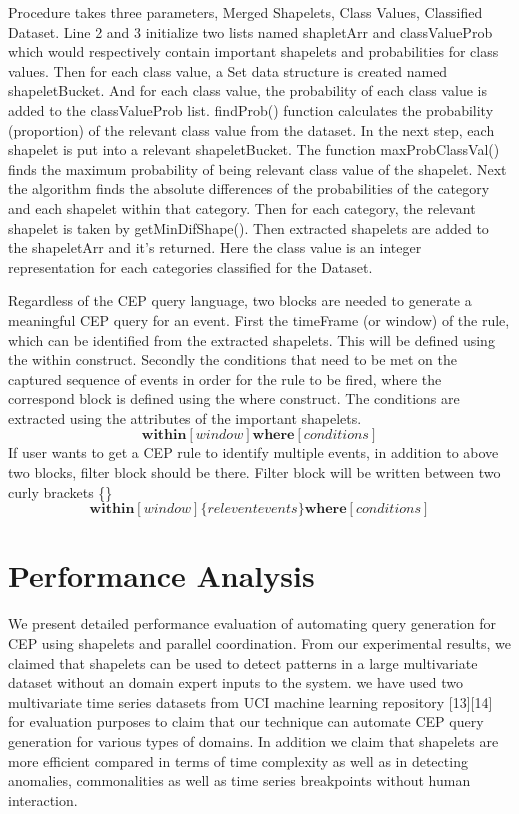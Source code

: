 \documentclass[letterpaper, 10 pt, conference]{IEEEtran}  %
\begin{document}
Procedure takes three parameters, Merged Shapelets, Class Values, Classified Dataset. Line 2 and 3 initialize two lists named shapletArr and classValueProb which would respectively contain important shapelets and probabilities for class values. Then for each class value, a Set data structure is created named shapeletBucket. And for each class value, the probability of each class value is added to the classValueProb list. findProb() function calculates the probability (proportion) of the relevant class value from the dataset. In the next step, each shapelet is put into a relevant shapeletBucket. The function maxProbClassVal() finds the maximum probability of being relevant class value of the shapelet. Next the algorithm finds the absolute differences of the probabilities of the category and each shapelet within that category. Then for each category, the relevant shapelet is taken by getMinDifShape(). Then extracted shapelets are added to the shapeletArr and it’s returned. Here the class value is an integer representation for each categories classified for the Dataset.

Regardless of the CEP query language, two blocks are needed to generate a meaningful CEP query for an event. First the timeFrame (or window) of the rule, which can be identified from the extracted shapelets. This will be defined using the within construct. Secondly the conditions that need to be met on the captured sequence of events in order for the rule to be fired, where the correspond block is defined using the where construct. The conditions are extracted using the attributes of the important shapelets.
\begin{equation}
\textbf{within}[window] \textbf{where}[conditions]
\end{equation}
If user wants to get a CEP rule to identify multiple events, in addition to above two blocks, filter block should be there. Filter block will be written between two curly brackets \{\}
\begin{equation}
\textbf{within}[window] \{relevent events\} \textbf{where}[conditions]
\end{equation}


\section{Performance Analysis}
We present detailed performance evaluation of automating query generation for CEP using shapelets and parallel coordination. From our experimental results, we claimed that shapelets can be used to detect patterns in a large multivariate dataset without an domain expert inputs to the system. we have used two multivariate time series datasets from UCI machine learning repository [13][14] for evaluation purposes to claim that our technique can automate CEP query generation for various types of domains. In addition we claim that shapelets are more efficient compared in terms of time complexity as well as in detecting anomalies, commonalities as well as time series breakpoints without human interaction.
\end{document}
